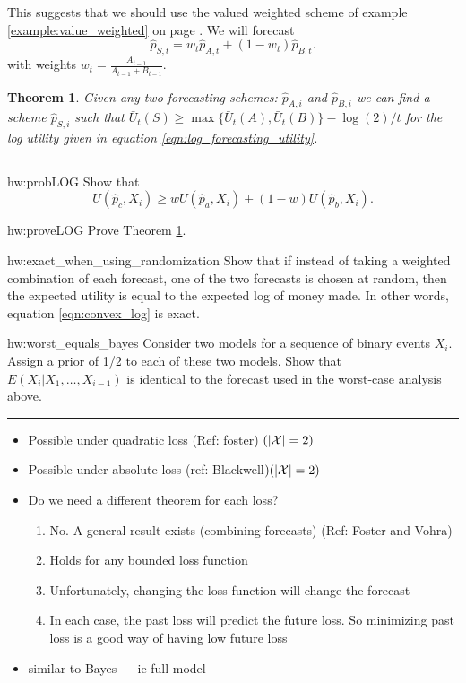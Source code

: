\documentclass{book}
\newtheorem{theorem}{Theorem}[chapter]
\newenvironment{textHW}{
  \noindent\rule{\textwidth}{1pt}%
  \begin{list}{}{
      \setlength{\labelwidth}{1cm}
      \setlength{\labelsep}{0.3cm}
      \setlength{\leftmargin}{1.3cm}
      \setlength{\rightmargin}{1cm}
      \setlength{\parsep}{0.5ex plus0.2ex minus0.1ex}
      \setlength{\topsep}{1pt plus3pt minus1pt}
      \setlength{\itemsep}{0ex plus0.2ex} 
      \renewcommand{\makelabel}[1]{\label{thw:##1}{\ref{##1}}}
      \sl}}%
  {\end{list}\rule{\textwidth}{1pt}}
\newcommand{\notes}{\index{personal notes}}
\begin{document}
This suggests that we should use the valued weighted scheme of example
\ref{example:value_weighted} on page \pageref{example:value_weighted}.  We
will forecast
$$\widehat{p}_{S,t} = w_t \widehat{p}_{A,t} + (1-w_t)
\widehat{p}_{B,t}.$$
with weights $w_t = \frac{A_{t-1}}{A_{t-1} + B_{t-1}}$.



\begin{theorem} \label{thm:twoFORECASTS} Given any two forecasting
  schemes: $\widehat{p}_{A,i}$ 
  and $\widehat{p}_{B,i}$ we can find a scheme $\widehat{p}_{S,i}$
  such that $\bar{U}_t(S) \ge \max\{\bar{U}_t(A),\bar{U}_t(B)\} -
  \log(2)/t$ for the log utility given in equation
  \ref{eqn:log_forecasting_utility}.
\end{theorem}


\begin{textHW}
\item[hw:probLOG] Show that 
        \begin{equation}
        \label{eqn:convex_log}
        U(\widehat{p}_c,X_i) \ge w
          U(\widehat{p}_a,X_i) + (1-w) U(\widehat{p}_b,X_i).
        \end{equation}
\item[hw:proveLOG] Prove Theorem \ref{thm:twoFORECASTS}.
\item[hw:exact_when_using_randomization]  Show that if instead of taking
  a weighted combination of each forecast, one of the two forecasts is
  chosen at random, then the expected utility is equal to the
  expected log of money made. In other words, equation
  \ref{eqn:convex_log} is exact. 
\item[hw:worst_equals_bayes] Consider two models for a sequence of binary
  events $X_i$.  Assign a prior of 1/2 to each of these two models.
  Show that $E(X_i|X_1,\ldots,X_{i-1})$ is identical to the forecast
  used in the worst-case analysis above.
\end{textHW}

{\notes

\begin{itemize}
\item Possible under quadratic loss (Ref: foster) $(|{\cal X}|=2)$

\item Possible under absolute loss (ref: Blackwell$) (| {\cal
    X}| =2)$

\item  Do we need a different theorem for each loss?
  \begin{enumerate}
  \item No.  A general result exists (combining forecasts) (Ref: Foster
    and Vohra)
  \item  Holds for any bounded loss function
  \item Unfortunately, changing the loss function will change the
    forecast
  \item In each case, the past loss will predict the future loss.  So
    minimizing past loss is a good way of having low future loss
  \end{enumerate}
\item similar to Bayes --- ie full model
\end{itemize}
}
 
\end{document}
